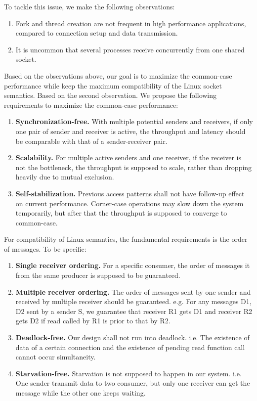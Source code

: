 To tackle this issue, we make the following observations:
\begin{enumerate}
	\item Fork and thread creation are not frequent in high performance applications, compared to connection setup and data transmission.
	\item It is uncommon that several processes receive concurrently from one shared socket.
\end{enumerate} 

Based on the observations above, our goal is to maximize the common-case performance while keep the maximum compatibility of the Linux socket semantics.
Based on the second observation. We propose the following requirements to maximize the common-case performance:
\begin{enumerate}
 \item \textbf{Synchronization-free.} With multiple potential senders and receivers, if only one pair of sender and receiver is active, the throughput and latency should be comparable with that of a sender-receiver pair.
 \item \textbf{Scalability.} For multiple active senders and one receiver, if the receiver is not the bottleneck, the throughput is supposed to scale, rather than dropping heavily due to mutual exclusion.
 \item \textbf{Self-stabilization.} Previous access patterns shall not have follow-up effect on current performance. Corner-case operations may slow down the system temporarily, but after that the throughput is supposed to converge to common-case.
\end{enumerate}

For compatibility of Linux semantics, the fundamental requirements is the order of messages. To be specific:
\begin{enumerate}
\item \textbf{Single receiver ordering.} For a specific consumer, the order of messages it from the same producer is supposed to be guaranteed.
\item \textbf{Multiple receiver ordering.} The order of messages sent by one sender and received by multiple receiver should be guaranteed. e.g. For any messages D1, D2 sent by a sender S,  we guarantee that receiver R1 gets D1 and receiver R2 gets D2 if read called by R1 is prior to that by R2. 
\item \textbf{Deadlock-free.} Our design shall not run into deadlock. i.e. The existence of data of a certain connection and the existence of pending read function call cannot occur simultaneity.
\item \textbf{Starvation-free.} Starvation is not supposed to happen in our system. i.e. One sender transmit data to two consumer, but only one receiver can get the message while the other one keeps waiting.
\end{enumerate}

